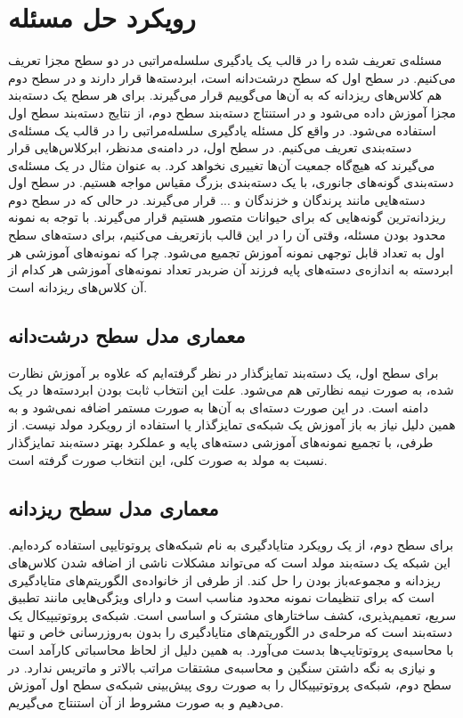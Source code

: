 \section{رویکرد حل مسئله}\label{sec:approach}

مسئله‌ی تعریف شده را در قالب یک یادگیری سلسله‌مراتبی در دو سطح مجزا تعریف می‌کنیم. در سطح اول که سطح درشت‌دانه است، ابردسته‌ها قرار دارند و در سطح دوم هم کلاس‌های ریزدانه که به آن‌ها 
می‌گوییم قرار می‌گیرند. برای هر سطح یک دسته‌بند مجزا آموزش داده می‌شود و در استنتاج دسته‌بند سطح دوم، از نتایج دسته‌بند سطح اول استفاده ‌می‌شود. در واقع کل مسئله یادگیری سلسله‌مراتبی را در قالب یک مسئله‌ی دسته‌بندی 
تعریف می‌کنیم. در سطح اول، در دامنه‌ی مدنظر، ابرکلاس‌هایی قرار می‌گیرند که هیچ‌گاه جمعیت آن‌ها تغییری نخواهد کرد. به عنوان مثال در یک مسئله‌ی دسته‌بندی گونه‌های جانوری، با یک دسته‌بندی بزرگ مقیاس مواجه هستیم. در سطح اول دسته‌هایی مانند پرندگان و خزندگان و ... قرار می‌گیرند. در حالی که در سطح دوم ریزدانه‌ترین گونه‌هایی که برای حیوانات متصور هستیم قرار می‌گیرند. با توجه به نمونه محدود بودن مسئله، وقتی آن را در این قالب بازتعریف می‌کنیم، برای دسته‌های سطح اول به تعداد قابل توجهی نمونه آموزش تجمیع می‌شود. چرا که نمونه‌های آموزشی هر ابردسته به اندازه‌ی دسته‌های پایه فرزند آن ضربدر تعداد نمونه‌های آموزشی هر کدام از آن کلاس‌های ریزدانه است. 

\subsection{معماری مدل سطح درشت‌دانه}
برای سطح اول، یک دسته‌بند تمایزگذار در نظر گرفته‌ایم که علاوه بر آموزش نظارت شده، به صورت نیمه نظارتی هم 
می‌شود. علت این انتخاب ثابت بودن ابردسته‌ها در یک دامنه است. در این صورت دسته‌ای به آن‌ها به صورت مستمر اضافه نمی‌شود و به همین دلیل نیاز به باز آموزش یک شبکه‌ی تمایزگذار یا استفاده از رویکرد مولد نیست. از طرفی، با تجمیع نمونه‌های آموزشی دسته‌های پایه و عملکرد بهتر دسته‌بند تمایزگذار نسبت به مولد به صورت کلی، این انتخاب صورت گرفته است. 

\subsection{معماری مدل سطح ریز‌دانه}
برای سطح دوم، از یک رویکرد متایادگیری به نام شبکه‌های پروتوتایپی
\cite{Snell2017PrototypicalNF}
 استفاده کرده‌ایم. این شبکه یک دسته‌بند مولد است که می‌تواند مشکلات ناشی از اضافه شدن کلاس‌های ریزدانه و مجموعه‌باز بودن را حل کند. از طرفی از خانواده‌ی الگوریتم‌های متایادگیری است که برای تنظیمات نمونه محدود مناسب است و دارای ویژگی‌هایی مانند تطبیق سریع، تعمیم‌پذیری، کشف ساختار‌های مشترک و اساسی است. شبکه‌ی پروتوتیپیکال یک دسته‌بند 
 است که مرحله‌ی 
 در الگوریتم‌های متایادگیری را بدون به‌روزرسانی خاص و تنها با محاسبه‌ی پروتوتایپ‌ها بدست می‌آورد. به همین دلیل از لحاظ محاسباتی کارآمد است و نیازی به نگه داشتن 
 سنگین و محاسبه‌ی مشتقات مراتب بالاتر و ماتریس 
 ندارد. در سطح دوم، شبکه‌ی پروتوتیپیکال را به صورت 
 روی پیش‌بینی شبکه‌ی سطح اول آموزش می‌دهیم و به صورت مشروط از آن استنتاج می‌گیریم.
 
